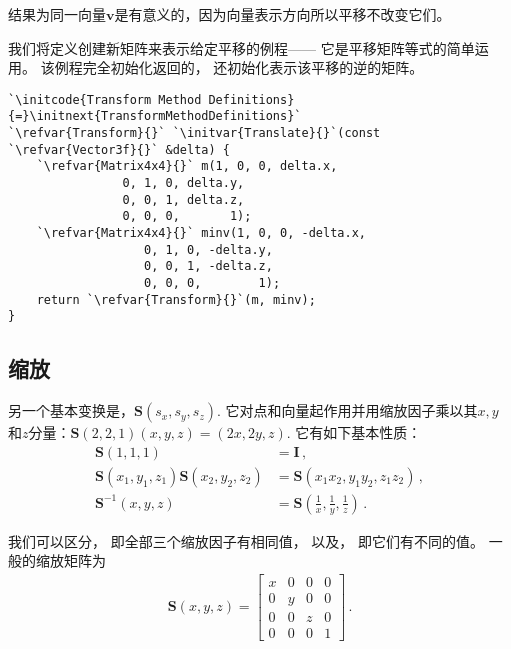 结果为同一向量$\bm v$是有意义的，因为向量表示方向所以平移不改变它们。

我们将定义创建新矩阵来表示给定平移的例程——
它是平移矩阵等式的简单运用。
该例程完全初始化返回的，
还初始化表示该平移的逆的矩阵。
\begin{lstlisting}
`\initcode{Transform Method Definitions}{=}\initnext{TransformMethodDefinitions}`
`\refvar{Transform}{}` `\initvar{Translate}{}`(const `\refvar{Vector3f}{}` &delta) {
    `\refvar{Matrix4x4}{}` m(1, 0, 0, delta.x,
                0, 1, 0, delta.y,
                0, 0, 1, delta.z, 
                0, 0, 0,       1);
    `\refvar{Matrix4x4}{}` minv(1, 0, 0, -delta.x,
                   0, 1, 0, -delta.y,
                   0, 0, 1, -delta.z, 
                   0, 0, 0,        1);
    return `\refvar{Transform}{}`(m, minv);
}
\end{lstlisting}

\subsection{缩放}\label{sub:缩放}
另一个基本变换是，$\bm S(s_x,s_y,s_z)$.
它对点和向量起作用并用缩放因子乘以其$x,y$和$z$分量：$\bm S(2,2,1)(x,y,z)=(2x,2y,z)$.
它有如下基本性质：
\begin{align*}
    \bm S(1,1,1)                         & =\bm I\, ,                                                 \\
    \bm S(x_1,y_1,z_1)\bm S(x_2,y_2,z_2) & =\bm S(x_1x_2,y_1y_2,z_1z_2)\, ,                           \\
    \bm S^{-1}(x,y,z)                    & =\bm S\left(\frac{1}{x},\frac{1}{y},\frac{1}{z}\right)\, .
\end{align*}

我们可以区分，
即全部三个缩放因子有相同值，
以及，
即它们有不同的值。
一般的缩放矩阵为
\begin{align*}
    \bm S(x,y,z)=\left[
        \begin{array}{cccc}
            x & 0 & 0 & 0 \\
            0 & y & 0 & 0 \\
            0 & 0 & z & 0 \\
            0 & 0 & 0 & 1
        \end{array}
        \right]\, .
\end{align*}


